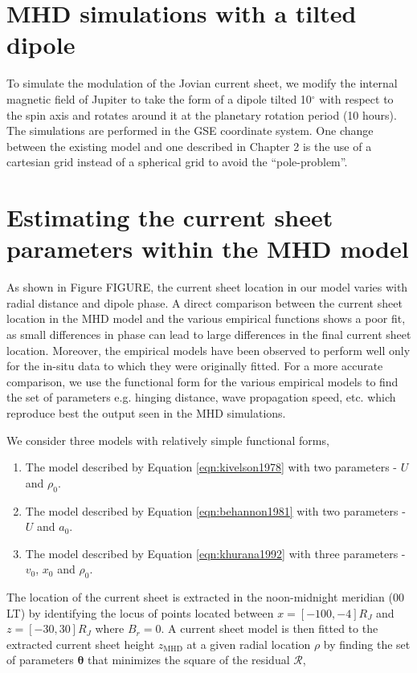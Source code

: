 \section{MHD simulations with a tilted dipole}
To simulate the modulation of the Jovian current sheet, we modify the internal magnetic field of Jupiter to take the form of a dipole tilted 10$^\circ$ with respect to the spin axis and rotates around it at the planetary rotation period (10 hours). The simulations are performed in the GSE coordinate system. One change between the existing model and one described in Chapter 2 is the use of a cartesian grid instead of a spherical grid to avoid the ``pole-problem''. 

\section{Estimating the current sheet parameters within the MHD model}
As shown in Figure FIGURE, the current sheet location in our model varies with radial distance and dipole phase. A direct comparison between the current sheet location in the MHD model and the various empirical functions shows a poor fit, as small differences in phase can lead to large differences in the final current sheet location. Moreover, the empirical models have been observed to perform well only for the in-situ data to which they were originally fitted. For a more accurate comparison, we use the functional form for the various empirical models to find the set of parameters e.g. hinging distance, wave propagation speed, etc. which reproduce best the output seen in the MHD simulations.

We consider three models with relatively simple functional forms,
\begin{enumerate}
    \item The  model described by Equation \ref{eqn:kivelson1978} with two parameters - $U$ and $\rho_0$.
    \item The  model described by Equation \ref{eqn:behannon1981} with two parameters - $U$ and $a_0$.
    \item The  model described by Equation \ref{eqn:khurana1992} with three parameters - $v_0$, $x_0$ and $\rho_0$.
\end{enumerate}

The location of the current sheet is extracted in the noon-midnight meridian (00 LT) by identifying the locus of points located between $x=[-100, -4] R_J$ and $z=[-30, 30] R_J$ where  $B_r=0$. A current sheet model is then fitted to the extracted current sheet height $z_\text{MHD}$ at a given radial location $\rho$ by finding the set of parameters $\boldsymbol\theta$ that minimizes the square of the residual $\mathcal{R}$,

